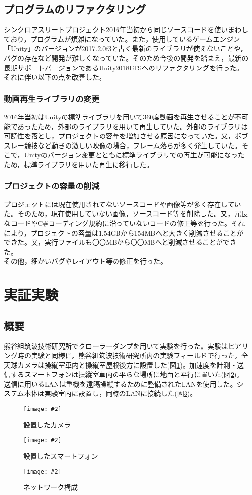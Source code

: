 \documentclass[a4paper,12pt]{jsarticle}
\newcommand{\figuref}[1]{図\ref{#1}}
\newcommand{\fig}[4][width=\textwidth]{
    \begin{figure}[!h]
    \begin{center}
    \texttt{[image: \#2]}
    \caption{#3}
    \label{#4}
    \vspace*{-1cm}
    \end{center}
    \end{figure}
}
\begin{document}
\subsection{プログラムのリファクタリング}
シンクロアスリートプロジェクト2016年当初から同じソースコードを使いまわしており，プログラムが煩雑になっていた。また，使用しているゲームエンジン「Unity」のバージョンが2017.2.0f3と古く最新のライブラリが使えないことや，バグの存在など開発が難しくなっていた。そのため今後の開発を踏まえ，最新の長期サポートバージョンであるUnity2018LTSへのリファクタリングを行った。それに伴い以下の点を改善した。

\subsubsection{動画再生ライブラリの変更}
2016年当初はUnityの標準ライブラリを用いて360度動画を再生させることが不可能であったため，外部のライブラリを用いて再生していた。外部のライブラリは可読性を落とし，プロジェクトの容量を増加させる原因になっていた。又，ボブスレー競技など動きの激しい映像の場合，フレーム落ちが多く発生していた。そこで，Unityのバージョン変更とともに標準ライブラリでの再生が可能になったため，標準ライブラリを用いた再生に移行した。

\subsubsection{プロジェクトの容量の削減}
プロジェクトには現在使用されてないソースコードや画像等が多く存在していた。そのため，現在使用していない画像，ソースコード等を削除した。又，冗長なコードやC\#コーディング規約に沿っていないコードの修正等を行った。それにより，プロジェクトの容量は1.54GBから154MBへと大きく削減させることができた。又，実行ファイルも〇〇MBから〇〇MBへと削減させることができた。
\\

その他，細かいバグやレイアウト等の修正を行った。

\clearpage

\section{実証実験}
\subsection{概要}
熊谷組筑波技術研究所でクローラーダンプを用いて実験を行った。実験はヒアリング時の実験と同様に，熊谷組筑波技術研究所内の実験フィールドで行った。全天球カメラは操縦室車内と操縦室屋根後方に設置した(\figuref{camera_test})。加速度を計測・送信するスマートフォンは操縦室車内の平らな場所に地面と平行に置いた(\figuref{phone})。送信に用いるLANは重機を遠隔操縦するために整備されたLANを使用した。システム本体は実験室内に設置し，同様のLANに接続した(\figuref{lan})。
\fig[width=7cm]{image/camera_test.png}{設置したカメラ}{camera_test}
\fig[width=7cm]{image/phone.jpg}{設置したスマートフォン}{phone}
\clearpage
\fig[width=7cm]{image/lan.png}{ネットワーク構成}{lan}
\end{document}
